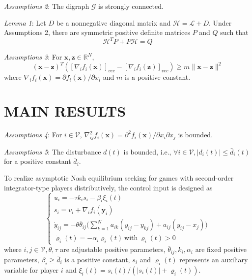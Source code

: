 \documentclass[lettersize,journal]{IEEEtran}
\begin{document}
\emph{Assumptions 2}: The digraph $\mathcal{G}$ is strongly connected.

\emph{Lemma 1}: Let $D$ be a nonnegative diagonal matrix and $\mathcal{H} = \mathcal{L} + D$. Under Assumptions 2, there are symmetric positive definite matrices $P$ and $Q$ such that
\begin{equation}
    \mathcal{H}^{T}P+P\mathcal{H}=Q
\end{equation}

\emph{Assumptions 3}: For $\mathbf{x}, \mathbf{z} \in \mathbb{R}^N$,
\begin{equation}
    (\mathbf{x}-\mathbf{z})^T([\nabla_if_i(\mathbf{x})]_{vec}-[\nabla_if_i(\mathbf{z})]_{vec})\geq m\|\mathbf{x}-\mathbf{z}\|^2
\end{equation}
where $\nabla_{i}f_{i}(\mathbf{x})=\partial f_{i}(\mathbf{x})/\partial x_{i}$ and $m$ is a positive constant.

\section{MAIN RESULTS}

\emph{Assumptions 4}: For $i \in \mathcal{V}$, $\nabla_{ij}^{2}f_{i}(\mathbf{x})=\partial^{2}f_{i}(\mathbf{x})/\partial x_{i}\partial x_{j}$ is bounded.

\emph{Assumptions 5}: The disturbance $d(t)$ is bounded, i.e., $\forall i \in \mathcal{V}, |d_i(t)|\leq \bar{d}_i(t)$ for a positive constant $\bar{d}_i$.

To realize asymptotic Nash equilibrium seeking for games with second-order integrator-type players distributively, the control input is designed as
\begin{equation}
    \begin{cases}
        u_i=-\tau k_is_i-\beta_i\xi_i(t)                                                                      \\
        s_i=v_i+\nabla_if_i(\mathbf{y}_i)                                                                     \\
        \dot{y}_{ij}=-\theta\bar{\theta}_{ij}\Bigg(\sum_{k=1}^Na_{ik}(y_{ij}-y_{kj})+a_{ij}(y_{ij}-x_j)\Bigg) \\
        \dot{\varrho}_i(t) = -\alpha_i \varrho_i(t)~\text{with}~\varrho_i(t) > 0
    \end{cases}
\end{equation}
where $i,j \in \mathcal{V}, \theta, \tau$ are adjustable positive parameters, $\bar{\theta}_{ij}, k_i, \alpha_i$ are fixed positive parameters, $\beta_i \geq \bar{d}_i$ is a positive constant, $s_i$ and $\varrho_i(t)$ represents an auxiliary variable for player $i$ and $\xi_i(t) = s_i(t)/(|s_i(t)| + \varrho_i(t))$.
\end{document}
